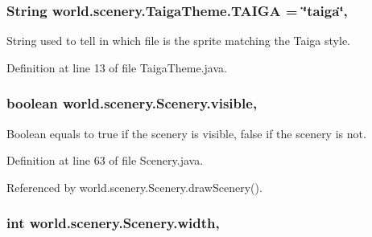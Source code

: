 \hypertarget{a00028_ad3418d8f4936efb0ef1e3eb2009a34f0}{
\subsubsection[{T\-A\-I\-G\-A}]{\setlength{\rightskip}{0pt plus 5cm}String world.\-scenery.\-Taiga\-Theme.\-T\-A\-I\-G\-A = \char`\"{}taiga\char`\"{}\hspace{0.3cm}{\ttfamily [static]}, {\ttfamily [inherited]}}}\label{a00028_ad3418d8f4936efb0ef1e3eb2009a34f0}


String used to tell in which file is the sprite matching the Taiga style. 



Definition at line 13 of file Taiga\-Theme.\-java.

\hypertarget{a00024_a7b22a78d3126c947b7010fdbbea02218}{
\subsubsection[{visible}]{\setlength{\rightskip}{0pt plus 5cm}boolean world.\-scenery.\-Scenery.\-visible\hspace{0.3cm}{\ttfamily [protected]}, {\ttfamily [inherited]}}}\label{a00024_a7b22a78d3126c947b7010fdbbea02218}


Boolean equals to true if the scenery is visible, false if the scenery is not. 



Definition at line 63 of file Scenery.\-java.



Referenced by world.\-scenery.\-Scenery.\-draw\-Scenery().

\hypertarget{a00024_ad10b27080954e2fc06aa1718f47c4ce1}{
\subsubsection[{width}]{\setlength{\rightskip}{0pt plus 5cm}int world.\-scenery.\-Scenery.\-width\hspace{0.3cm}{\ttfamily [protected]}, {\ttfamily [inherited]}}}\label{a00024_ad10b27080954e2fc06aa1718f47c4ce1}


